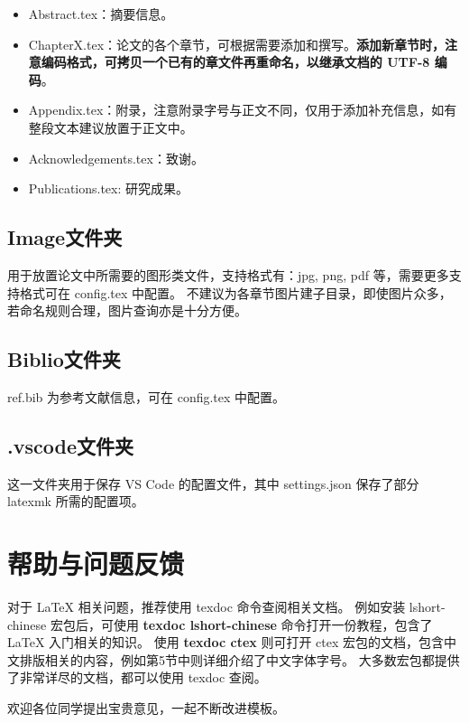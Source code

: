\begin{itemize}
    \item Abstract.tex：摘要信息。
    \item ChapterX.tex：论文的各个章节，可根据需要添加和撰写。\textbf{添加新章节时，注意编码格式，可拷贝一个已有的章文件再重命名，以继承文档的 UTF-8 编码}。
    \item Appendix.tex：附录，注意附录字号与正文不同，仅用于添加补充信息，如有整段文本建议放置于正文中。
    \item Acknowledgements.tex：致谢。
    \item Publications.tex: 研究成果。
\end{itemize}

\subsection{Image文件夹}

用于放置论文中所需要的图形类文件，支持格式有：jpg, png, pdf 等，需要更多支持格式可在 config.tex 中配置。
不建议为各章节图片建子目录，即使图片众多，若命名规则合理，图片查询亦是十分方便。

\subsection{Biblio文件夹}

ref.bib 为参考文献信息，可在 config.tex 中配置。

\subsection{.vscode文件夹}

这一文件夹用于保存 VS Code 的配置文件，其中 settings.json 保存了部分 latexmk 所需的配置项。



\section{帮助与问题反馈}\label{sec:help}

对于 \LaTeX{} 相关问题，推荐使用 texdoc 命令查阅相关文档。
例如安装 lshort-chinese 宏包后，可使用 \textbf{texdoc lshort-chinese} 命令打开一份教程，包含了 \LaTeX{} 入门相关的知识。
使用 \textbf{texdoc ctex} 则可打开 ctex 宏包的文档，包含中文排版相关的内容，例如第5节中则详细介绍了中文字体字号。
大多数宏包都提供了非常详尽的文档，都可以使用 texdoc 查阅。

欢迎各位同学提出宝贵意见，一起不断改进模板。